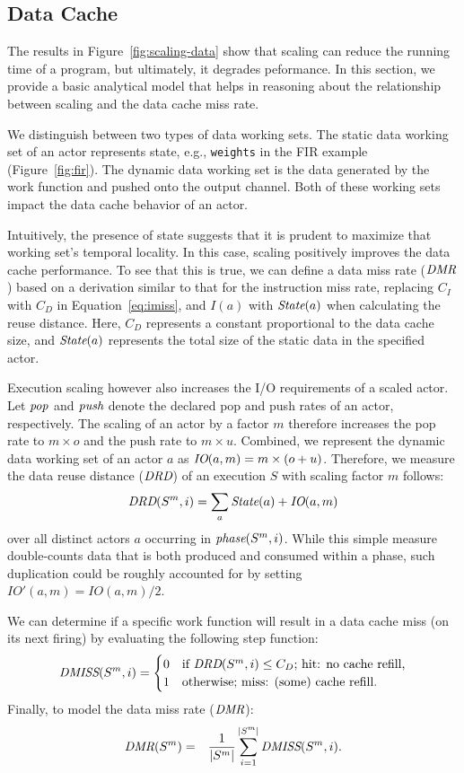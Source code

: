 \subsection{Data Cache}

The results in Figure~\ref{fig:scaling-data} show that scaling can
reduce the running time of a program, but ultimately, it degrades
peformance. In this section, we provide a basic analytical model that
helps in reasoning about the relationship between scaling and the data
cache miss rate. 

We distinguish between two types of data working sets. The static data
working set of an actor represents state, e.g., \texttt{weights} in
the FIR example (Figure~\ref{fig:fir}).  The dynamic data
working set is the data generated by the work function and pushed onto
the output channel. Both of these working sets impact the data cache
behavior of an actor.

Intuitively, the presence of state suggests that it is
prudent to maximize that working set's temporal locality. In this
case, scaling positively improves the data cache performance. To see
that this is true, we can define a data miss rate ($\mbox{\it DMR}$) based on
a derivation similar to that for the instruction miss rate, replacing
$C_I$ with $C_D$ in Equation~\ref{eq:imiss}, and $I(a)$ with
$\mbox{\it State}(a)$ when calculating the reuse distance. Here, $C_D$
represents a constant proportional to the data cache size, and
$\mbox{\it State}(a)$ represents the total size of the static data in the
specified actor. 

Execution scaling however also increases the I/O requirements of a
scaled actor. Let $\mbox{\it pop}$ and $\mbox{\it push}$ denote the declared pop and push rates
of an actor, respectively.  The scaling of an
actor by a factor $m$ therefore increases the pop rate to $m\times o$
and the push rate to $m\times u$. Combined, we represent the dynamic
data working set of an actor $a$ as $\mbox{\it IO}(a, m) =
m\times(o+u)$. Therefore, we measure the data reuse distance ($\mbox{\it DRD}$)
of an execution $S$ with scaling factor $m$ follows:
\[
  \mbox{\it DRD}(S^m,i)=\sum_{a} \mbox{\it State}(a) + \mbox{\it IO}(a,m)
\]
over all distinct actors $a$ occurring in $\mbox{\it phase}(S^m,i)$.  While
this simple measure double-counts data that is both produced and
consumed within a phase, such duplication could be roughly accounted
for by setting $IO'(a,m) = IO(a,m) / 2$.

We can determine if a
specific work function will result in a data cache miss (on its next
firing) by evaluating the following step function:
\begin{equation}
\label{eq:dmiss}
  \mbox{\it DMISS}(S^m,i) =
    \begin{cases}
      0& \text{if $\mbox{\it DRD}(S^m,i) \leq C_D$; hit: no cache refill,}\\
      1& \text{otherwise; miss: (some) cache refill.}
    \end{cases}
\end{equation}
Finally, to model the data miss rate ($\mbox{\it DMR}$):
\begin{eqnarray}
  \label{eq:dmrM}
  \mbox{\it DMR}(S^m) &=& \frac{1}{|S^m|}\sum_{i=1}^{|S^m|} \mbox{\it DMISS}(S^m,i).
\end{eqnarray}

